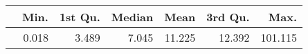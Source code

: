 \begin{table}[ht]
\centering
\begin{tabular}{rrrrrrr}
  \hline
 & Min. & 1st Qu. & Median & Mean & 3rd Qu. & Max. \\ 
  \hline
 & 0.018 & 3.489 & 7.045 & 11.225 & 12.392 & 101.115 \\ 
   \hline
\end{tabular}
\end{table}

